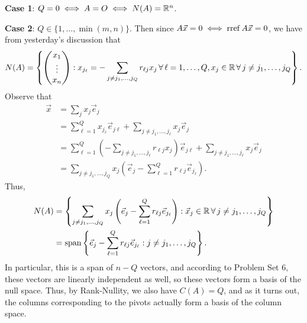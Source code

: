 \documentclass[main.tex]{subfiles}
\begin{document}
\textbf{Case 1}: $Q = 0 \iff A = O\iff N(A) = \mathbb R^n$.

\textbf{Case 2}: $Q \in \{1, \ldots , \min(m, n)\}$. Then since $A\vec{x} = 0\iff \operatorname{rref} A\vec{x} = 0$, we have from yesterday's discussion that
\[N(A) = \left\{\begin{pmatrix}
x_1 \\ \vdots \\ x_n
\end{pmatrix} : x_{j_\ell} = -\sum_{j \neq j_1, \ldots , j_Q} r_{\ell j}x_j \,\forall\, \ell = 1, \ldots , Q, x_j\in \mathbb R\,\forall\, j\neq j_1, \ldots , j_Q\right\}.\]
Observe that
\begin{align*}
    \vec{x} &= \sum_j x_j\vec{e}_j \\
    &= \sum_{\ell = 1}^Q x_{j_\ell}\vec{e}_{j\ell} + \sum_{j\neq j_1, \ldots , j_\ell} x_j\vec{e}_j \\
    &= \sum_{\ell = 1}^Q \left(-\sum_{j\neq j_1, \ldots , j_\ell} r_{\ell j}x_j\right)\vec{e}_{j\ell} + \sum_{j\neq j_1, \ldots , j_\ell} x_j\vec{e}_j \\ 
    &= \sum_{j\neq j_1, \ldots , j_Q} x_j\left(\vec{e}_j - \sum_{\ell = 1}^Q r_{\ell j}\vec{e}_{j_\ell}\right).
\end{align*}
Thus,
\begin{align*}
    N(A) &= \left\{\sum_{j\neq j_1, \ldots , j_Q} x_j\left(\vec{e}_j - \sum_{\ell = 1}^Q r_{\ell j}\vec{e}_{j_\ell}\right) : \vec{x}_j\in \mathbb R\,\forall\, j\neq j_1, \ldots , j_Q\right\} \\
    &= \operatorname{span}\left\{\vec{e}_j - \sum_{\ell = 1}^Q r_{\ell j}\vec{e}_{j_\ell} : j\neq j_1, \ldots , j_Q\right\}.
\end{align*}
In particular, this is a span of $n - Q$ vectors, and according to Problem Set 6, these vectors are linearly independent as well, so these vectors form a basis of the null space. Thus, by Rank-Nullity, we also have $C(A) = Q$, and as it turns out, the columns corresponding to the pivots actually form a basis of the column space.
\end{document}
